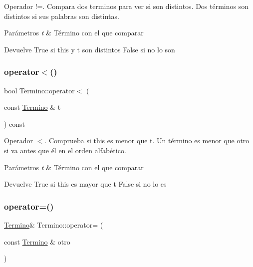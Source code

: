 Operador !=. Compara dos terminos para ver si son distintos. Dos términos son distintos si sus palabras son distintas. 


\begin{DoxyParams}{Parámetros}
{\em t} & Término con el que comparar \\
\hline
\end{DoxyParams}
\begin{DoxyReturn}{Devuelve}
True si this y t son distintos False si no lo son 
\end{DoxyReturn}
\mbox{\label{classTermino_a2674fda8a9f8f9e40ba338953e3e94ae}} 
\subsubsection{\texorpdfstring{operator$<$()}{operator<()}}
{\footnotesize\ttfamily bool Termino\+::operator$<$ (\begin{DoxyParamCaption}\item[{const \hyperlink{classTermino}{Termino} \&}]{t }\end{DoxyParamCaption}) const}



Operador $<$. Comprueba si this es menor que t. Un término es menor que otro si va antes que él en el orden alfabético. 


\begin{DoxyParams}{Parámetros}
{\em t} & Término con el que comparar \\
\hline
\end{DoxyParams}
\begin{DoxyReturn}{Devuelve}
True si this es mayor que t False si no lo es 
\end{DoxyReturn}
\mbox{\label{classTermino_a57e30838c746677128101bae99df1366}} 
\subsubsection{\texorpdfstring{operator=()}{operator=()}}
{\footnotesize\ttfamily \hyperlink{classTermino}{Termino}\& Termino\+::operator= (\begin{DoxyParamCaption}\item[{const \hyperlink{classTermino}{Termino} \&}]{otro }\end{DoxyParamCaption})}



